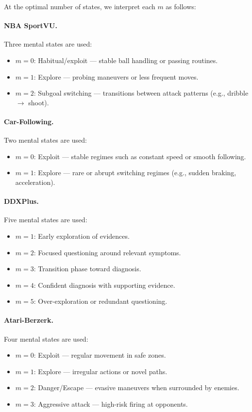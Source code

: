 \documentclass{article} %
\begin{document}
At the optimal number of states, we interpret each $m$ as follows:

\paragraph{NBA SportVU.}
Three mental states are used:
\begin{itemize}
  \item $m=0$: Habitual/exploit --- stable ball handling or passing routines.
  \item $m=1$: Explore --- probing maneuvers or less frequent moves.
  \item $m=2$: Subgoal switching --- transitions between attack patterns (e.g., dribble $\to$ shoot).
\end{itemize}

\paragraph{Car-Following.}
Two mental states are used:
\begin{itemize}
  \item $m=0$: Exploit --- stable regimes such as constant speed or smooth following.
  \item $m=1$: Explore --- rare or abrupt switching regimes (e.g., sudden braking, acceleration).
\end{itemize}

\paragraph{DDXPlus.}
Five mental states are used:
\begin{itemize}
  \item $m=1$: Early exploration of evidences.
  \item $m=2$: Focused questioning around relevant symptoms.
  \item $m=3$: Transition phase toward diagnosis.
  \item $m=4$: Confident diagnosis with supporting evidence.
  \item $m=5$: Over-exploration or redundant questioning.
\end{itemize}

\paragraph{Atari-Berzerk.}
Four mental states are used:
\begin{itemize}
  \item $m=0$: Exploit --- regular movement in safe zones.
  \item $m=1$: Explore --- irregular actions or novel paths.
  \item $m=2$: Danger/Escape --- evasive maneuvers when surrounded by enemies.
  \item $m=3$: Aggressive attack --- high-risk firing at opponents.
\end{itemize}
\end{document}
